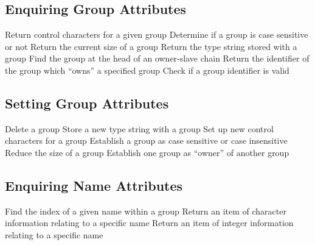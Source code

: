 \subsection{Enquiring Group Attributes}

            {Return control characters for a given group}
            {Determine if a group is case sensitive or not}
            {Return the current size of a group}
            {Return the type string stored with a group}
            {Find the group at the head of an owner-slave chain}
            {Return the identifier of the group which ``owns'' a specified
group}
            {Check if a group identifier is valid}


\subsection{Setting Group Attributes}

            {Delete a group}
            {Store a new type string with a group}
            {Set up new control characters for a group}
            {Establish a group as case sensitive or case insensitive}
            {Reduce the size of a group}
            {Establish one group as ``owner'' of another group}


\subsection{Enquiring Name Attributes}

            {Find the index of a given name within a group}
            {Return an item of character information relating to a specific name}
            {Return an item of integer information relating to a specific name}


